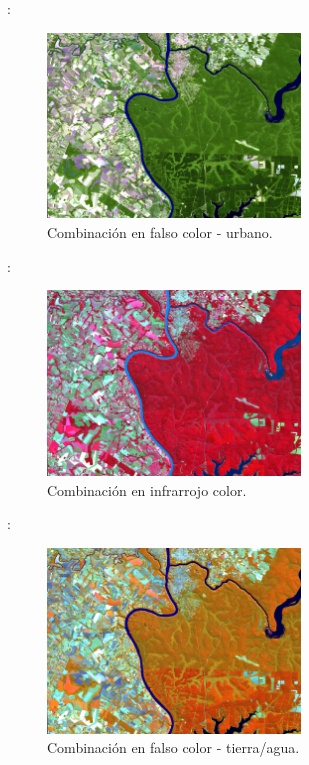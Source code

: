\documentclass[aspectratio=169]{beamer}
\begin{document}
\begin{frame}{\secname : \subsecname}
    \begin{figure}[h!]
        \centering
        \includegraphics[width=0.6\textwidth]{12-11-4.jpeg}
        \caption{Combinación en falso color - urbano.}
        \label{12-11-4}
    \end{figure}
\end{frame}

\begin{frame}{\secname : \subsecname}
    \begin{figure}[h!]
        \centering
        \includegraphics[width=0.6\textwidth]{8-4-3.jpeg}
        \caption{Combinación en infrarrojo color.}
        \label{8-4-3}
    \end{figure}
\end{frame}

\begin{frame}{\secname : \subsecname}
    \begin{figure}[h!]
        \centering
        \includegraphics[width=0.6\textwidth]{8-11-4.jpeg}
        \caption{Combinación en falso color - tierra/agua.}
        \label{8-11-4}
    \end{figure}
\end{frame}
\end{document}
